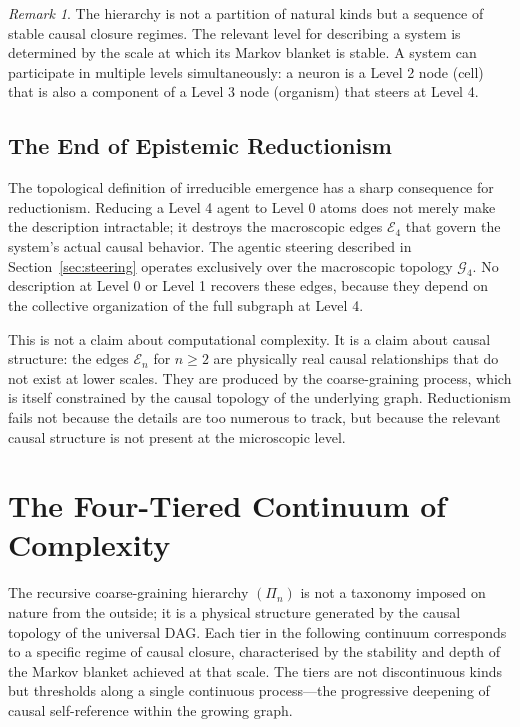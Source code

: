 \documentclass[11pt,a4paper]{article}
\theoremstyle{remark}
\newtheorem{remark}[theorem]{Remark}
\newcommand{\GG}{\mathcal{G}}
\newcommand{\EE}{\mathcal{E}}
\begin{document}
\begin{remark}
The hierarchy is not a partition of natural kinds but a sequence of stable
causal closure regimes. The relevant level for describing a system is determined
by the scale at which its Markov blanket is stable. A system can participate in
multiple levels simultaneously: a neuron is a Level 2 node (cell) that is also
a component of a Level 3 node (organism) that steers at Level 4.
\end{remark}

\subsection{The End of Epistemic Reductionism}

The topological definition of irreducible emergence has a sharp consequence for
reductionism. Reducing a Level 4 agent to Level 0 atoms does not merely make the
description intractable; it destroys the macroscopic edges $\EE_4$ that govern
the system's actual causal behavior. The agentic steering described in
Section~\ref{sec:steering} operates exclusively over the macroscopic topology
$\GG_4$. No description at Level 0 or Level 1 recovers these edges, because they
depend on the collective organization of the full subgraph at Level 4.

This is not a claim about computational complexity. It is a claim about causal
structure: the edges $\EE_n$ for $n \geq 2$ are physically real causal
relationships that do not exist at lower scales. They are produced by the
coarse-graining process, which is itself constrained by the causal topology of
the underlying graph. Reductionism fails not because the details are too numerous
to track, but because the relevant causal structure is not present at the
microscopic level.

\section{The Four-Tiered Continuum of Complexity}
\label{sec:continuum}

The recursive coarse-graining hierarchy $(\Pi_n)$ is not a taxonomy imposed on
nature from the outside; it is a physical structure generated by the causal
topology of the universal DAG. Each tier in the following continuum corresponds
to a specific regime of causal closure, characterised by the stability and
depth of the Markov blanket achieved at that scale. The tiers are not
discontinuous kinds but thresholds along a single continuous process---the
progressive deepening of causal self-reference within the growing graph.
\end{document}
